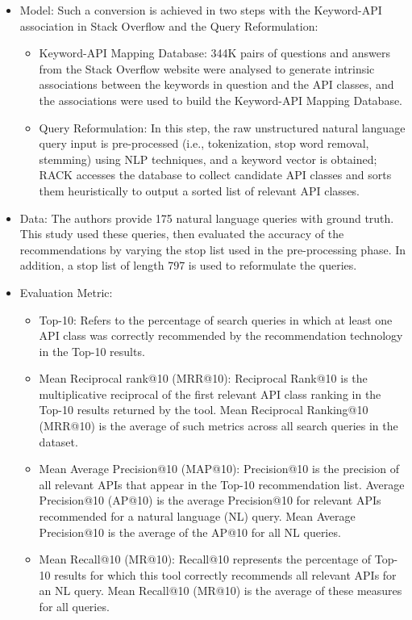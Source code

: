 \documentclass[conference]{IEEEtran}
\begin{document}
\begin{sloppy}
\begin{itemize}
\item Model: Such a conversion is achieved in two steps with the Keyword-API association in Stack Overflow and the Query Reformulation:  
\begin{itemize}
\item Keyword-API Mapping Database: 344K pairs of questions and answers from the Stack Overflow website were analysed to generate intrinsic associations between the keywords in question and the API classes, and the associations were used to build the Keyword-API Mapping Database. 
\item Query Reformulation: In this step, the raw unstructured natural language query input is pre-processed (i.e., tokenization, stop word removal, stemming) using NLP techniques, and a keyword vector is obtained; RACK accesses the database to collect candidate API classes and sorts them heuristically to output a sorted list of relevant API classes. 
\end{itemize}
\item Data: The authors provide 175 natural language queries with ground truth. This study used these queries, then evaluated the accuracy of the recommendations by varying the stop list used in the pre-processing phase. In addition, a stop list of length 797 is used to reformulate the queries. 
\item Evaluation Metric: 
\begin{itemize}
\item Top-10: Refers to the percentage of search queries in which at least one API class was correctly recommended by the recommendation technology in the Top-10 results. 
\item Mean Reciprocal rank@10 (MRR@10): Reciprocal Rank@10 is the multiplicative reciprocal of the first relevant API class ranking in the Top-10 results returned by the tool. Mean Reciprocal Ranking@10 (MRR@10) is the average of such metrics across all search queries in the dataset. 
\item Mean Average Precision@10 (MAP@10): Precision@10 is the precision of all relevant APIs that appear in the Top-10 recommendation list. Average Precision@10 (AP@10) is the average Precision@10 for relevant APIs recommended for a natural language (NL) query. Mean Average Precision@10 is the average of the AP@10 for all NL queries. 
\item Mean Recall@10 (MR@10): Recall@10 represents the percentage of Top-10 results for which this tool correctly recommends all relevant APIs for an NL query. Mean Recall@10 (MR@10) is the average of these measures for all queries. 
\end{itemize}
\end{itemize}


\end{sloppy}
\end{document}
